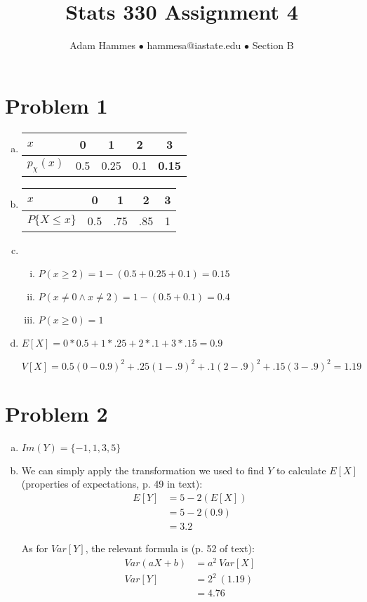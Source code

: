 \documentclass[11pt]{article}
\begin{document}
\title{Stats 330 Assignment 4}
\author{Adam Hammes $\bullet$ hammesa@iastate.edu $\bullet$ Section B}
\maketitle

\section*{Problem 1}
\begin{enumerate}[(a)]
	\item
	\begin{tabular}{l| c c c c|}
		$x$ & 0 & 1 & 2 & 3 \\
		\hline
		$p_{\chi}(x)$ & 0.5 & 0.25 & 0.1 & \textbf{0.15}\\
	\end{tabular}
	
	\item
	\begin{tabular}{l| c c c c|}
		$x$ & 0 & 1 & 2 & 3\\
		\hline
		$P\{X \leq x\}$ & 0.5 & .75 &.85 & 1\\
	\end{tabular}
	\item
	\begin{enumerate}[i.]
		\item $P ( x \ge 2) = 1 - (0.5 + 0.25 + 0.1 ) = 0.15$
	
		\item $P ( x \neq 0 \wedge x \neq 2 ) = 1 - (0.5 + 0.1 ) = 0.4$
	
		\item $P ( x \ge 0 ) = 1$
	\end{enumerate}
	\item	
	$E[X] = 0 * 0.5 + 1 * .25 + 2 * .1 + 3 * .15 = 0.9$
		
	$V[X] = 0.5(0 - 0.9)^2 + .25(1-.9)^2+ .1(2-.9)^2  + .15(3-.9)^2 = 1.19$

\end{enumerate}


\section*{Problem 2}
\begin{enumerate}[(a)]
	\item $Im(Y) = \{-1, 1, 3, 5\}$
	
	\item We can simply apply the transformation we used to find $Y$ to calculate $E[X]$ (properties of expectations, p. 49 in text):
		\begin{align*}
		E[Y] &= 5 - 2( E[X] ) \\
		&= 5 - 2( 0.9 ) \\
		&= 3.2
		\end{align*}
		
		As for $Var[Y]$, the relevant formula is (p. 52 of text):
		\begin{align*}
			Var(aX + b) &= a^2\ Var[X] \\
			Var[Y] &= 2^2\ (1.19) \\
			&= 4.76
		\end{align*}
\end{enumerate}
\end{document}
